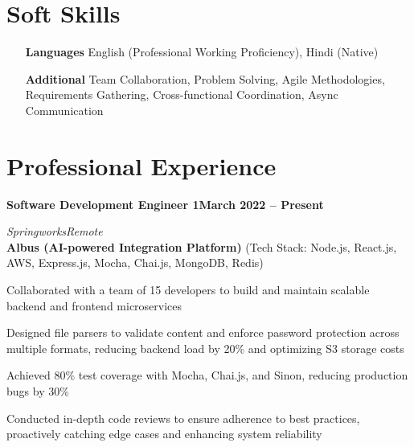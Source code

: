 \documentclass[letterpaper,10pt]{article}
\newcommand{\heading}[2]{
  \hspace{6pt}#1\hfill#2\\[0.8pt]
}
\newcommand{\headingBf}[2]{
  \heading{\textbf{#1}}{\textbf{#2}}
}
\newcommand{\headingIt}[2]{
  \heading{\textit{#1}}{\textit{#2}}
}
\newenvironment{resume_list}{
  \vspace{-5pt}
  \begin{itemize}[itemsep=-3pt, parsep=0.2pt, leftmargin=20pt]
}{
  \end{itemize}
  \vspace{-4pt}
}
\begin{document}
\section{Soft Skills}
\begin{itemize}[itemsep=-2pt, parsep=0.5pt, leftmargin=70pt]
    \item[\textbf{Languages}] English (Professional Working Proficiency), Hindi (Native)
    \item[\textbf{Additional}] Team Collaboration, Problem Solving, Agile Methodologies, Requirements Gathering, Cross-functional Coordination, Async Communication
\end{itemize}

\section{Professional Experience}
\headingBf{Software Development Engineer 1}{March 2022 -- Present}
\vspace{1pt}
\headingIt{Springworks}{Remote}
\vspace{2pt}
\hspace{10pt}\textbf{Albus (AI-powered Integration Platform)} \small{(Tech Stack: Node.js, React.js, AWS, Express.js, Mocha, Chai.js, MongoDB, Redis)}
\vspace{1pt}
\begin{resume_list}
    \item Collaborated with a team of 15 developers to build and maintain scalable backend and frontend microservices
    \item Designed file parsers to validate content and enforce password protection across multiple formats, reducing backend load by 20\% and optimizing S3 storage costs
    \item Achieved 80\% test coverage with Mocha, Chai.js, and Sinon, reducing production bugs by 30\%
    \item Conducted in-depth code reviews to ensure adherence to best practices, proactively catching edge cases and enhancing system reliability
\end{resume_list}
\vspace{4pt}
\end{document}
